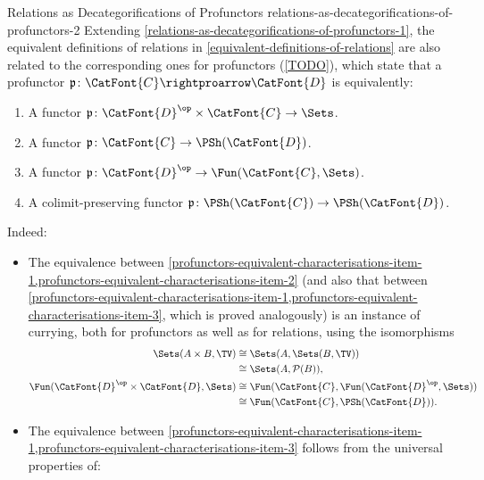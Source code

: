 \begin{remark}{Relations as Decategorifications of Profunctors \rmII}{relations-as-decategorifications-of-profunctors-2}%
    Extending \cref{relations-as-decategorifications-of-profunctors-1}, the equivalent definitions of relations in \cref{equivalent-definitions-of-relations} are also related to the corresponding ones for profunctors (\cref{TODO}), which state that a profunctor $\mathfrak{p}\colon\CatFont{C}\rightproarrow\CatFont{D}$ is equivalently:
    \begin{enumerate}
        \item\label{profunctors-equivalent-characterisations-item-1}A                    functor $\mathfrak{p}\colon\CatFont{D}^{\op}\times\CatFont{C}\to\Sets$.
        \item\label{profunctors-equivalent-characterisations-item-2}A                    functor $\mathfrak{p}\colon\CatFont{C}\to\PSh(\CatFont{D})$.
        \item\label{profunctors-equivalent-characterisations-item-3}A                    functor $\mathfrak{p}\colon\CatFont{D}^{\op}\to\Fun(\CatFont{C},\Sets)$.
        \item\label{profunctors-equivalent-characterisations-item-4}A colimit-preserving functor $\mathfrak{p}\colon\PSh(\CatFont{C})\to\PSh(\CatFont{D})$.
    \end{enumerate}
    Indeed:
    \begin{itemize}
        \item The equivalence between \cref{profunctors-equivalent-characterisations-item-1,profunctors-equivalent-characterisations-item-2} (and also that between \cref{profunctors-equivalent-characterisations-item-1,profunctors-equivalent-characterisations-item-3}, which is proved analogously) is an instance of currying, both for profunctors as well as for relations, using the isomorphisms
            \begin{align*}
                \Sets(A\times B,\TV)       &\cong \Sets(A,\Sets(B,\TV))\\
                                                                          &\cong \Sets(A,\mathcal{P}(B)),\\
                \Fun(\CatFont{D}^{\op}\times\CatFont{D},\Sets) &\cong \Fun(\CatFont{C},\Fun(\CatFont{D}^{\op},\Sets))\\
                                                                          &\cong \Fun(\CatFont{C},\PSh(\CatFont{D})).
            \end{align*}
        \item The equivalence between \cref{profunctors-equivalent-characterisations-item-1,profunctors-equivalent-characterisations-item-3} follows from the universal properties of:

\end{itemize}
\end{remark}

